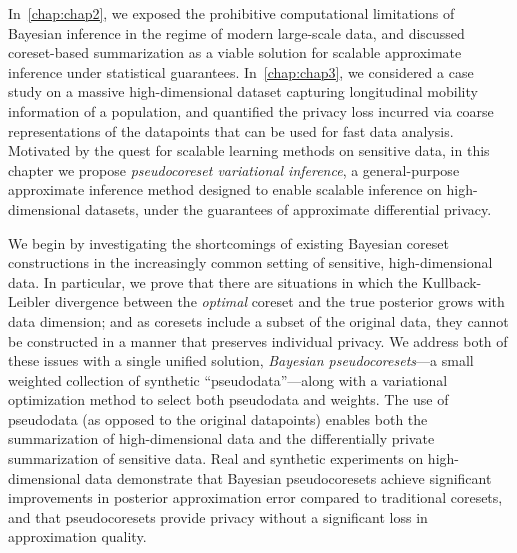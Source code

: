 In~\cref{chap:chap2}, we exposed the prohibitive computational limitations of Bayesian inference in the regime of modern large-scale data, and discussed coreset-based summarization as a viable solution for scalable approximate inference under statistical guarantees. In~\cref{chap:chap3}, we considered a case study on a massive high-dimensional dataset capturing longitudinal mobility information of a population, and quantified the privacy loss incurred via coarse representations of the datapoints that can be used for fast data analysis.
Motivated by the quest for scalable learning methods on sensitive data, in this chapter we propose \emph{pseudocoreset  variational inference}, a general-purpose approximate inference method designed to enable scalable inference on high-dimensional datasets, under the guarantees of approximate differential privacy.

We begin by investigating the shortcomings of existing Bayesian coreset constructions 
in the increasingly common setting of sensitive, high-dimensional data. 
In particular, we prove that there are situations in which 
the Kullback-Leibler divergence between the \emph{optimal} coreset 
and the true posterior grows with data dimension; and as coresets include
a subset of the original data, they cannot be constructed in a manner
that preserves individual privacy.
We address both of these issues with a single unified solution, \emph{Bayesian
pseudocoresets}---a small weighted collection of synthetic
``pseudodata''---along with a variational optimization method to select both
pseudodata and weights.  The use of pseudodata (as opposed to
the original datapoints) enables both the summarization of high-dimensional data
and the  differentially private summarization of
sensitive data. Real and
synthetic experiments on high-dimensional data demonstrate that Bayesian 
pseudocoresets achieve significant improvements in posterior approximation error compared to
traditional coresets, and that pseudocoresets provide privacy without
a significant loss in approximation quality. 


